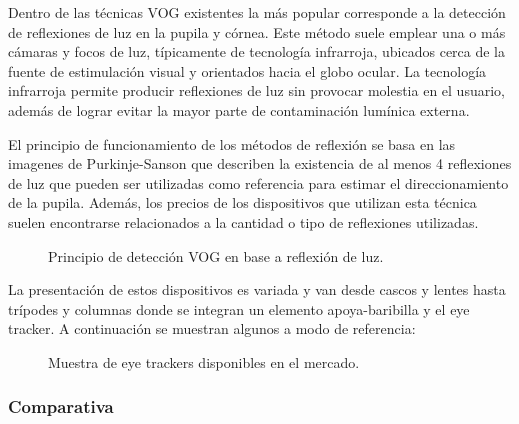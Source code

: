 \documentclass[../main.tex]{subfiles}
\begin{document}
\begin{enumerate}
					Dentro de las técnicas VOG existentes la más popular corresponde a la detección de reflexiones de luz en la pupila y córnea. Este método suele emplear una o más cámaras y focos de luz, típicamente de tecnología infrarroja, ubicados cerca de la fuente de estimulación visual y orientados hacia el globo ocular. La tecnología infrarroja permite producir reflexiones de luz sin provocar molestia en el usuario, además de lograr evitar la mayor parte de contaminación lumínica externa. 

					El principio de funcionamiento de los métodos de reflexión se basa en las imagenes de Purkinje-Sanson que describen la existencia de al menos 4 reflexiones de luz que pueden ser utilizadas como referencia para estimar el direccionamiento de la pupila. Además, los precios de los dispositivos que utilizan esta técnica suelen encontrarse relacionados a la cantidad o tipo de reflexiones utilizadas.
					\begin{figure}[H]
						\centering
						\hspace{5mm}
						\caption{Principio de detección VOG en base a reflexión de luz\cite{dissertation:eyetrackers}.}
						\label{fig:02_et_vog1}
					\end{figure}

					La presentación de estos dispositivos es variada y van desde cascos y lentes hasta trípodes y columnas donde se integran un elemento apoya-baribilla y el eye tracker. A continuación se muestran algunos a modo de referencia:
					\begin{figure}[H]
						\centering
						\hspace{5mm}
						\caption{Muestra de eye trackers disponibles en el mercado.}
						\label{fig:02_et_vog2}
					\end{figure}  

				\end{enumerate}

			\subsubsection{Comparativa}
			\label{ssub:02_comparativa_eyetracker}
\end{document}
